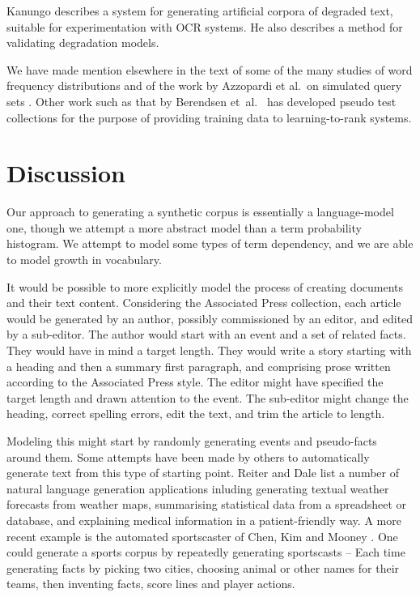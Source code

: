 \documentclass[11pt]{report}
\begin{document}
Kanungo \cite{Kanungo1996} describes a system for generating 
artificial corpora of degraded text, suitable for experimentation
with OCR systems.  He also describes a method for validating 
degradation models.
 
We have made mention elsewhere in the text of some of the many 
studies of word frequency distributions and of the work by 
Azzopardi et al.~on simulated query sets \cite{AzzopardideRijke2006}
\cite{AzzopardideRijkeBalog2007}.  Other work such as that by
Berendsen et~al.~\cite{BerendsenTsagkiasdeRijkeMeij2012} 
\cite{BerendsenTsagkiasWeerkampdeRijke2013} has developed pseudo
test collections for the purpose of providing training data to
learning-to-rank systems.

\chapter{Discussion} %

Our approach to generating a synthetic corpus is essentially a
language-model one, though we attempt a more abstract model
than a term probability histogram.   We attempt to model some types of
term dependency, and we are able to model growth in vocabulary.  

It would be possible to more explicitly model the process of creating
documents and their text content.   Considering the Associated Press
collection, each article would be generated by an author, possibly
commissioned by an editor, and edited by a sub-editor.  The author
would start with an event and a set of related facts. They would have
in mind a target length. They would write
a story starting with a heading and then a summary first paragraph,
and comprising prose written according to the Associated Press style.
The editor might have specified the target length and drawn attention to the
event. The sub-editor might change the heading, correct spelling
errors, edit the text, and trim the article to length.

Modeling this might start by randomly generating events and
pseudo-facts around them.  Some attempts have been made by others 
to automatically generate text from this type of starting point.
Reiter and Dale \cite{ReiterD1997} list a number of natural language
generation applications inluding generating textual weather forecasts
from weather maps, summarising statistical data from a spreadsheet or
database, and explaining medical information in a patient-friendly way.
A more recent example is the
automated sportscaster of Chen, Kim and Mooney
\cite{ChenKimMooney2010}.  One could generate a sports corpus by
repeatedly generating sportscasts -- Each time generating facts by
picking two cities, choosing animal or other names for their teams,
then inventing facts, score lines and player actions.
\end{document}

